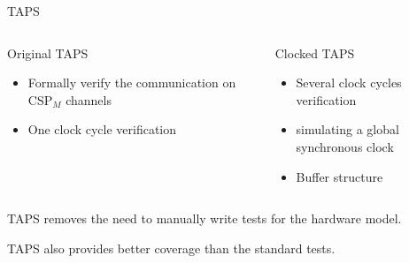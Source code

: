 \documentclass[11pt]{beamer}
\newcommand{\cspm}{CSP$_M$}
\begin{document}
\begin{frame}{TAPS}
    \begin{columns}[t, totalwidth=1.02\textwidth]

        \begin{column}{0.45\linewidth}
            \begin{block}{Original TAPS}
                \begin{itemize}

                    \item Formally verify the communication on \cspm{} channels
                    \item One clock cycle verification
                \end{itemize}
            \end{block}
        \end{column}

        \pause

        \begin{column}{0.45\linewidth}
            \begin{block}{Clocked TAPS}
                \begin{itemize}
                    \item Several clock cycles verification
                    \item simulating a global synchronous clock
                    \item Buffer structure
                \end{itemize}
            \end{block}
        \end{column}

    \end{columns}

\pause

  \begin{block}{}
     TAPS removes the need to manually write tests for the hardware model.
  \end{block}

  \pause

  \begin{block}{}
     TAPS also provides better coverage than the standard tests.
  \end{block}
\end{frame}
\end{document}
